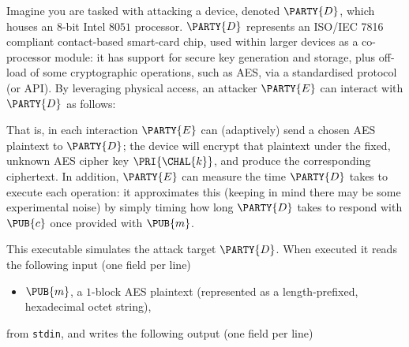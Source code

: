 %



Imagine you are tasked with attacking a device, denoted $\PARTY{D}$, 
which houses an $8$-bit Intel $8051$ processor.
$\PARTY{D}$ represents an ISO/IEC 7816 compliant contact-based smart-card
chip, used within larger devices as a co-processor module: it has support
for secure key generation and storage, plus off-load of some cryptographic 
operations, such as AES, via a standardised protocol (or API).
By leveraging physical access, 
an attacker $\PARTY{E}$ can interact with $\PARTY{D}$ as follows:

\begin{center}

\end{center}

\noindent
That is, in each interaction $\PARTY{E}$ can (adaptively) send 
a chosen AES  plaintext
to $\PARTY{D}$; the device will
encrypt that  plaintext under the fixed, unknown AES cipher key $\PRI{\CHAL{k}}$,
and produce 
the corresponding ciphertext.
In addition, $\PARTY{E}$ can measure the time $\PARTY{D}$ takes to execute 
each operation: it approximates this 
(keeping in mind there may be some experimental noise) 
by simply timing how long $\PARTY{D}$ takes to respond with $\PUB{c}$ once
provided with $\PUB{m}$.




This executable simulates the attack target $\PARTY{D}$.  When executed it 
 reads the following  input (one field per line)

\begin{itemize}
\item $\PUB{m}$,
      a  ${1}$-block AES plaintext
      (represented as a  length-prefixed, hexadecimal octet   string),
\end{itemize}

\noindent
from \lstinline[language={bash}]{stdin},
and 
writes the following output (one field per line)

